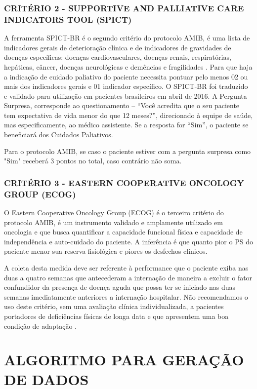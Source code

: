 \documentclass[12pt]{article}
\begin{document}
\subsubsection{CRITÉRIO 2 - SUPPORTIVE AND PALLIATIVE CARE INDICATORS TOOL (SPICT)}

A ferramenta SPICT-BR é o segundo critério do protocolo AMIB, é uma lista de indicadores gerais de deterioração clínica e de indicadores de gravidades de doenças específicas: doenças
cardiovasculares, doenças renais, respiratórias, hepáticas, câncer, doenças neurológicas e
demências e fragilidades \cite{rodriguez2021pergunta}. Para que haja a indicação de cuidado paliativo do paciente necessita pontuar pelo menos 02 ou mais dos indicadores gerais e 01 indicador específico. O SPICT-BR foi traduzido e validado para utilização em pacientes brasileiros em abril de 2016. A Pergunta Surpresa, corresponde ao questionamento – “Você acredita que o seu paciente tem expectativa de vida menor do que 12 meses?”, direcionado à equipe de saúde, mas especificamente, ao médico assistente. Se a resposta for “Sim”, o paciente se beneficiará dos Cuidados Paliativos.

Para o protocolo AMIB, se caso o paciente estiver com a pergunta surpresa como "Sim" receberá 3 pontos no total, caso contrário não soma.

\subsubsection{CRITÉRIO 3 - EASTERN COOPERATIVE ONCOLOGY GROUP (ECOG)}
O Eastern Cooperative Oncology Group (ECOG) é o terceiro critério do protocolo AMIB, é um
instrumento validado e amplamente utilizado em oncologia e que busca quantificar a capacidade funcional física e capacidade de independência e auto-cuidado do paciente. A inferência é que quanto pior o PS do paciente menor sua reserva fisiológica e piores os desfechos clínicos.

A coleta desta medida deve ser referente à performance que o paciente exiba nas duas a quatro semanas que antecederam a internação de maneira a excluir o fator confundidor da presença de doença aguda que possa ter se iniciado nas duas semanas imediatamente anteriores a internação hospitalar. Não recomendamos o uso deste critério, sem uma avaliação clínica individualizada, a pacientes portadores de deficiências físicas de longa data e que apresentem uma boa condição de adaptação \cite{pinto2000physician}.

\section{ALGORITMO PARA GERAÇÃO DE DADOS}
\end{document}
